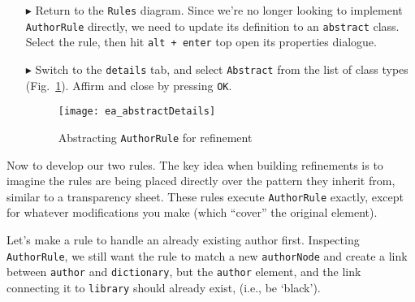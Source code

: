 \begin{itemize}

\item[$\blacktriangleright$] Return to the \texttt{Rules} diagram. Since we're no longer looking to implement \texttt{AuthorRule} directly, we need to update
its definition to an \texttt{abstract} class. Select the rule, then hit \texttt{alt + enter} top open its properties dialogue.

\item[$\blacktriangleright$] Switch to the \texttt{details} tab, and select \texttt{Abstract} from the list of class types (Fig.~\ref{ea:abstractDetails}). 
Affirm and close by pressing \texttt{OK}.

\begin{figure}[htbp]
\begin{center}
  \texttt{[image: ea\_abstractDetails]}
  \caption{Abstracting \texttt{AuthorRule} for refinement}
  \label{ea:abstractDetails}
\end{center}
\end{figure}

\end{itemize}

Now to develop our two rules. The key idea when building refinements is to imagine the rules are being placed directly over the
pattern they inherit from, similar to a transparency sheet. These rules execute \texttt{AuthorRule} exactly, except for whatever modifications you make (which
``cover'' the original element).

Let's make a rule to handle an already existing author first. Inspecting \texttt{AuthorRule}, we still want the rule to match a new \texttt{authorNode}
and create a link between \texttt{author} and \texttt{dictionary}, but the \texttt{author} element, and the link connecting it to \texttt{library} should
already exist, (i.e., be `black').

